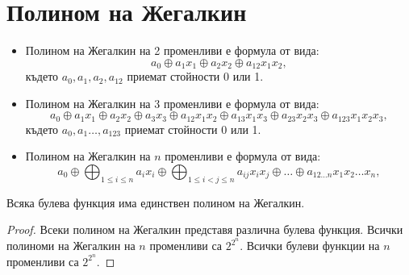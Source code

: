 \begin{solution}
\begin{enumerate}[a)]
\end{enumerate}
\end{solution}




\section{Полином на Жегалкин}

\begin{itemize}
\item 
  Полином на Жегалкин на 2 променливи е формула от вида:
  \[a_0\oplus a_1x_1\oplus a_2x_2  \oplus a_{12}x_1x_2  ,\]
  където $a_0,a_1,a_2,a_{12}$ приемат стойности 0 или 1.
\item
  Полином на Жегалкин на 3 променливи е формула от вида:
  \[a_0\oplus a_1x_1\oplus a_2x_2 \oplus a_3x_3 \oplus a_{12}x_1x_2 \oplus a_{13}x_1x_3 \oplus a_{23} x_2x_3 \oplus a_{123}x_1x_2x_3,\]  
  където $a_0,a_1\dots,a_{123}$ приемат стойности 0 или 1.
\item
  Полином на Жегалкин на $n$ променливи е формула от вида:
  \[a_0 \oplus \bigoplus_{1\leq i\leq n}a_i x_i\oplus \bigoplus_{1\leq i<j \leq n}a_{ij} x_ix_j\oplus\dots  \oplus a_{12\dots n} x_1x_2\dots x_n,\]
\end{itemize}

\begin{thm}
  Всяка булева функция има единствен полином на Жегалкин.
\end{thm}
\begin{proof}
  Всеки полином на Жегалкин представя различна булева функция.
  Всички полиноми на Жегалкин на $n$ променливи са $2^{2^n}$.
  Всички булеви функции на $n$ променливи са $2^{2^n}$.
\end{proof}


